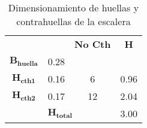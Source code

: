 \begin{table}[H]
  \centering
  
    \begin{tabular}{|c|c|c|c|}
    \rowcolor[rgb]{ .2,  .247,  .31} \multicolumn{4}{|c}{\textcolor[rgb]{ 1,  1,  1}{\textbf{DIMENSIONAMIENTO ESCALERAS}}} \bigstrut[b]\\
    \hline
    \multicolumn{2}{|c|}{} & \textbf{No Cth} & \textbf{H} \bigstrut\\
    \hline
    $\mathbf{B_{huella}}$ & 0.28 &     &  \bigstrut\\
    \hline
    $\mathbf{H_{cth1}}$ & 0.16 & 6   & 0.96 \bigstrut\\
    \hline
    $\mathbf{H_{cth2}}$ & 0.17 & 12  & 2.04 \bigstrut\\
    \hline
    \multicolumn{3}{|c|}{$\mathbf{H_{total}}$} & 3.00 \bigstrut\\
    \hline
    \end{tabular}%
    \caption{Dimensionamiento de huellas y contrahuellas de la escalera}
  \label{tab:DIMescalera}%
\end{table}%